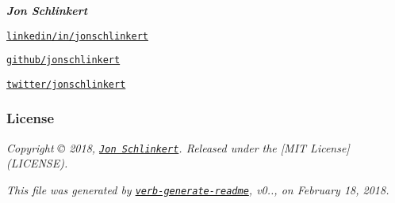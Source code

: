 {\itshape {\bfseries Jon Schlinkert}}

{\itshape 
\begin{DoxyItemize}
\item \href{https://linkedin.com/in/jonschlinkert}{\tt linkedin/in/jonschlinkert}
\item \href{https://github.com/jonschlinkert}{\tt github/jonschlinkert}
\item \href{https://twitter.com/jonschlinkert}{\tt twitter/jonschlinkert}
\end{DoxyItemize}}

{\itshape \subsubsection*{License}}

{\itshape }

{\itshape Copyright © 2018, \href{https://github.com/jonschlinkert}{\tt Jon Schlinkert}. Released under the \mbox{[}M\+IT License\mbox{]}(L\+I\+C\+E\+N\+SE).}

{\itshape 

}

{\itshape {\itshape This file was generated by \href{https://github.com/verbose/verb-generate-readme}{\tt verb-\/generate-\/readme}, v0.., on February 18, 2018.} }